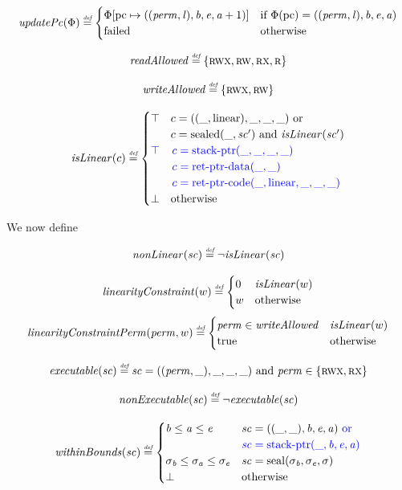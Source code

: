 \documentclass[a4paper]{article}
\begin{document}
\[
  \updPcAddr{\Phi} \defeq 
  \begin{cases}
    \Phi\update{\pcreg}{((\perm,\lin),\baddr,\eaddr,\aaddr+1)} & \text{if $\Phi(\pcreg) = ((\perm,\lin),\baddr,\eaddr,\aaddr)$}\\
    \failed & \totherwise
  \end{cases}
\]

\[
  \readAllowed{} \defeq \{ \rwx,\rw,\rx,\ro \}
\]

\[
  \writeAllowed{} \defeq \{ \rwx, \rw \}
\]

\[
  \isLinear{c} \defeq
  \begin{cases}
    \top & 
    \arraycolsep=0pt
    \begin{array}[t]{l}
      c = ((\_,\linear),\_,\_,\_) \tor\\
      c = \sealed{\_,\cb'} \tand \isLinear{\cb'} 
    \end{array}\\
    \src{\top} & 
    \sourcecolor\left.
    \arraycolsep=0pt
    \begin{array}[t]{l}
      c = \stkptr{\_,\_,\_,\_}\\
      c = \retptrd(\_,\_)\\
      c = \retptrc(\_,\linear,\_,\_,\_)
    \end{array}\right.\\
    \bot & \totherwise
  \end{cases}
\]

We now define 

\[
  \nonLinear{\cb} \defeq \neg \isLinear{\cb}
\]

\[
  \linCons{w} \defeq
  \begin{cases}
    0 & \isLinear{w} \\
    w & \totherwise
  \end{cases}
\]
\[
  \linConsPerm{\perm}{w} \defeq
  \begin{cases}
    \perm \in \writeAllowed{} & \isLinear{w} \\
    \mathrm{true} & \totherwise
  \end{cases}
\]

\[
  \exec{\cb} \defeq 
      \cb = ((\perm, \_), \_, \_, \_) \tand \perm \in \{\rwx,\rx\} 
\]

\[
  \nonExec{\cb} \defeq \neg \exec{\cb}
\]

\[
  \withinBounds{\vsc} \defeq 
  \begin{cases}
    \baddr \leq \aaddr \leq \eaddr & 
    \arraycolsep=0pt
    \begin{array}[t]{l}
      \vsc = ((\_,\_),\baddr,\eaddr,\aaddr) \src{\tor}\\
      \src{\vsc = \stkptr{\_,\baddr,\eaddr,\aaddr}}
    \end{array}\\
    \sigma_\baddr \leq \sigma_\aaddr \leq \sigma_\eaddr & \vsc = \seal{\sigma_\baddr,\sigma_\eaddr,\sigma} \\
    \bot & \totherwise
  \end{cases}
\]
\end{document}
